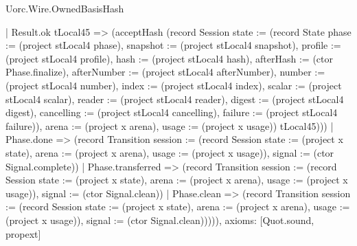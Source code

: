 \begin{lexlean}{Uorc.Wire.OwnedBasisHash}
\begin{semanticmodule}
{          | Result.ok tLocal45 => (acceptHash (record Session {state := (record State {phase := (project stLocal4 phase), snapshot := (project stLocal4 snapshot), profile := (project stLocal4 profile), hash := (project stLocal4 hash), afterHash := (ctor Phase.finalize), afterNumber := (project stLocal4 afterNumber), number := (project stLocal4 number), index := (project stLocal4 index), scalar := (project stLocal4 scalar), reader := (project stLocal4 reader), digest := (project stLocal4 digest), cancelling := (project stLocal4 cancelling), failure := (project stLocal4 failure)}), arena := (project x arena), usage := (project x usage)}) tLocal45)))
      | Phase.done => (record Transition {session := (record Session {state := (project x state), arena := (project x arena), usage := (project x usage)}), signal := (ctor Signal.complete)})
      | Phase.transferred => (record Transition {session := (record Session {state := (project x state), arena := (project x arena), usage := (project x usage)}), signal := (ctor Signal.clean)})
      | Phase.clean => (record Transition {session := (record Session {state := (project x state), arena := (project x arena), usage := (project x usage)}), signal := (ctor Signal.clean)})))),
  axioms: [Quot.sound, propext]
}


\end{semanticmodule}
\end{lexlean}
